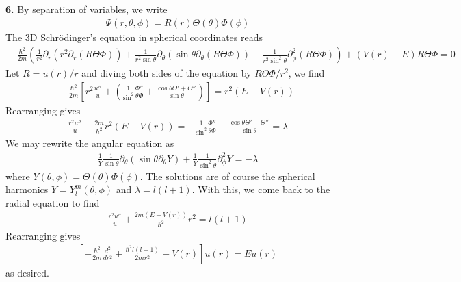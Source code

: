 \documentclass{article}
\theoremstyle{definition}
\newcommand{\p}{\partial}
\newcommand{\f}[2]{\frac{#1}{#2}}
\newcommand{\lp}{\left(}
\newcommand{\rp}{\right)}
\newcommand{\lb}{\left[}
\newcommand{\rb}{\right]}
\begin{document}
 
\noindent \textbf{6. } By separation of variables, we write
\begin{align*}
\Psi(r,\theta,\phi) = R(r)\Theta(\theta)\Phi(\phi)
\end{align*}
The 3D Schr\"{o}dinger's equation in spherical coordinates reads
\begin{align*}
-\f{\hbar^2}{2m}\lp \f{1}{r^2}\p_r (r^2 \p_r (R\Theta\Phi)) + \f{1}{r^2\sin\theta}\p_\theta (\sin\theta \p_\theta(R\Theta\Phi)) + \f{1}{r^2\sin^2\theta}\p^2_\phi(R\Theta\Phi)  \rp + (V(r) - E)R\Theta\Phi = 0
\end{align*}
Let $R = u(r)/r$ and diving both sides of the equation by $R\Theta\Phi/r^2$, we find 
\begin{align*}
-\f{\hbar^2}{2m}\lb r^2\f{u''}{u} + \lp \f{1}{\sin^2}\f{\Phi''}{\theta \Phi} + \f{\cos\theta \Theta' + \Theta''}{\sin\theta} \rp \rb = r^2(E-V(r))
\end{align*}
Rearranging gives
\begin{align*}
\f{r^2u''}{u} + \f{2m}{\hbar^2}r^2(E-V(r)) = - \f{1}{\sin^2}\f{\Phi''}{\theta \Phi} - \f{\cos\theta \Theta' + \Theta''}{\sin\theta} = \lambda
\end{align*}
We may rewrite the angular equation as 
\begin{align*}
\f{1}{Y}\f{1}{\sin\theta}\p_\theta\lp \sin\theta \p_\theta Y \rp + \f{1}{Y}\f{1}{\sin^2\theta}\p_\phi^2 Y = -\lambda
\end{align*}
where $Y(\theta,\phi) = \Theta(\theta)\Phi(\phi)$. The solutions are of course the spherical harmonics $ Y = Y^m_l(\theta,\phi)$ and $\lambda= l(l+1)$. With this, we come back to the radial equation to find 
\begin{align*}
\f{r^2 u''}{u} + \f{2m(E-V(r))}{\hbar^2}r^2 = l(l+1) 
\end{align*}
Rearranging gives
\begin{align*}
\lb -\f{\hbar^2}{2m} \f{d^2}{dr^2} + \f{\hbar^2 l(l+1)}{2mr^2} + V(r)\rb u(r) = Eu(r)
\end{align*}
as desired. \\
\end{document}
